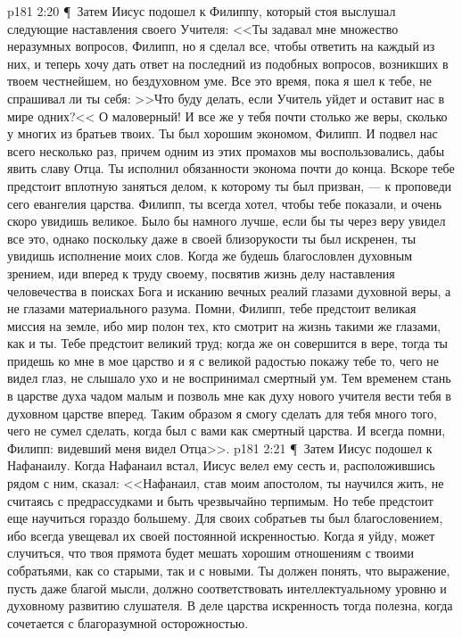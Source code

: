 \vs p181 2:20 \P\ Затем Иисус подошел к Филиппу, который стоя выслушал следующие наставления своего Учителя: <<Ты задавал мне множество неразумных вопросов, Филипп, но я сделал все, чтобы ответить на каждый из них, и теперь хочу дать ответ на последний из подобных вопросов, возникших в твоем честнейшем, но бездуховном уме. Все это время, пока я шел к тебе, не спрашивал ли ты себя: >>Что буду делать, если Учитель уйдет и оставит нас в мире одних?<< О маловерный! И все же у тебя почти столько же веры, сколько у многих из братьев твоих. Ты был хорошим экономом, Филипп. И подвел нас всего несколько раз, причем одним из этих промахов мы воспользовались, дабы явить славу Отца. Ты исполнил обязанности эконома почти до конца. Вскоре тебе предстоит вплотную заняться делом, к которому ты был призван, --- к проповеди сего евангелия царства. Филипп, ты всегда хотел, чтобы тебе показали, и очень скоро увидишь великое. Было бы намного лучше, если бы ты через веру увидел все это, однако поскольку даже в своей близорукости ты был искренен, ты увидишь исполнение моих слов. Когда же будешь благословлен духовным зрением, иди вперед к труду своему, посвятив жизнь делу наставления человечества в поисках Бога и исканию вечных реалий глазами духовной веры, а не глазами материального разума. Помни, Филипп, тебе предстоит великая миссия на земле, ибо мир полон тех, кто смотрит на жизнь такими же глазами, как и ты. Тебе предстоит великий труд; когда же он совершится в вере, тогда ты придешь ко мне в мое царство и я с великой радостью покажу тебе то, чего не видел глаз, не слышало ухо и не воспринимал смертный ум. Тем временем стань в царстве духа чадом малым и позволь мне как духу нового учителя вести тебя в духовном царстве вперед. Таким образом я смогу сделать для тебя много того, чего не сумел сделать, когда был с вами как смертный царства. И всегда помни, Филипп: видевший меня видел Отца>>.
\vs p181 2:21 \P\ Затем Иисус подошел к Нафанаилу. Когда Нафанаил встал, Иисус велел ему сесть и, расположившись рядом с ним, сказал: <<Нафанаил, став моим апостолом, ты научился жить, не считаясь с предрассудками и быть чрезвычайно терпимым. Но тебе предстоит еще научиться гораздо большему. Для своих собратьев ты был благословением, ибо всегда увещевал их своей постоянной искренностью. Когда я уйду, может случиться, что твоя прямота будет мешать хорошим отношениям с твоими собратьями, как со старыми, так и с новыми. Ты должен понять, что выражение, пусть даже благой мысли, должно соответствовать интеллектуальному уровню и духовному развитию слушателя. В деле царства искренность тогда полезна, когда сочетается с благоразумной осторожностью.
